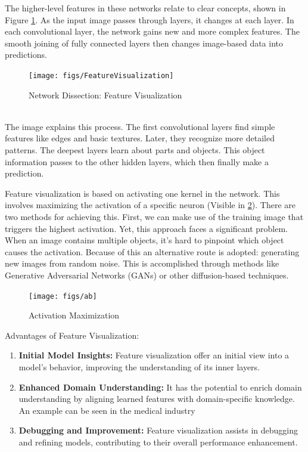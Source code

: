 The higher-level features in these networks relate to clear concepts, shown in Figure \ref{fig:feature-visualization}. As the input image passes through layers, it changes at each layer. In each convolutional layer, the network gains new and more complex features. The smooth joining of fully connected layers then changes image-based data into predictions.
\\
\begin{figure}[h!]
	\centering
	\texttt{[image: figs/FeatureVisualization]}
	\caption[Network Dissection: Feature Visualization]{Network Dissection: Feature Visualization \cite{olah2017feature}}
	\label{fig:feature-visualization}
\end{figure}
\\
The image explains this process. The first convolutional layers find simple features like edges and basic textures. Later, they recognize more detailed patterns. The deepest layers learn about parts and objects. This object information passes to the other hidden layers, which then finally make a prediction.

Feature visualization is based on activating one kernel in the network. This involves maximizing the activation of a specific neuron (Visible in \ref*{fig:optimization}). There are two methods for achieving this. First, we can make use of the training image that triggers the highest activation. Yet, this approach faces a significant problem. When an image contains multiple objects, it's hard to pinpoint which object causes the activation. Because of this an alternative route is adopted: generating new images from random noise. This is accomplished through methods like Generative Adversarial Networks (GANs) or other diffusion-based techniques.

\begin{figure}[h!]
	\centering
	\texttt{[image: figs/ab]}
	\caption[Activation Maximization]{Activation Maximization \cite{olah2017feature}}
	\label{fig:optimization}
\end{figure}

Advantages of Feature Visualization:
\begin{enumerate}
	\item \textbf{Initial Model Insights:} Feature visualization offer an initial view into a model's behavior, improving the understanding of its inner layers.
	\item \textbf{Enhanced Domain Understanding:} It has the potential to enrich domain understanding by aligning learned features with domain-specific knowledge. An example can be seen in the medical industry
	\item \textbf{Debugging and Improvement:} Feature visualization assists in debugging and refining models, contributing to their overall performance enhancement.
\end{enumerate}

